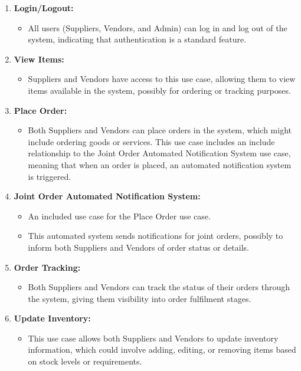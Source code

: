 \begin{enumerate}
    \item \textbf{Login/Logout:}
          \begin{itemize}
              \item All users (Suppliers, Vendors, and Admin) can log in and log out of the system, indicating that authentication is a standard feature.
          \end{itemize}

    \item \textbf{View Items:}
          \begin{itemize}
              \item Suppliers and Vendors have access to this use case, allowing them to view items available in the system, possibly for ordering or tracking purposes.
          \end{itemize}

    \item \textbf{Place Order:}
          \begin{itemize}
              \item Both Suppliers and Vendors can place orders in the system, which might include ordering goods or services. This use case includes an include relationship to the Joint Order Automated Notification System use case, meaning that when an order is placed, an automated notification system is triggered.
          \end{itemize}

    \item \textbf{Joint Order Automated Notification System:}
          \begin{itemize}
              \item An included use case for the Place Order use case.
              \item This automated system sends notifications for joint orders, possibly to inform both Suppliers and Vendors of order status or details.
          \end{itemize}

    \item \textbf{Order Tracking:}
          \begin{itemize}
              \item Both Suppliers and Vendors can track the status of their orders through the system, giving them visibility into order fulfilment stages.
          \end{itemize}

    \item \textbf{Update Inventory:}
          \begin{itemize}
              \item This use case allows both Suppliers and Vendors to update inventory information, which could involve adding, editing, or removing items based on stock levels or requirements.
          \end{itemize}


\end{enumerate}
